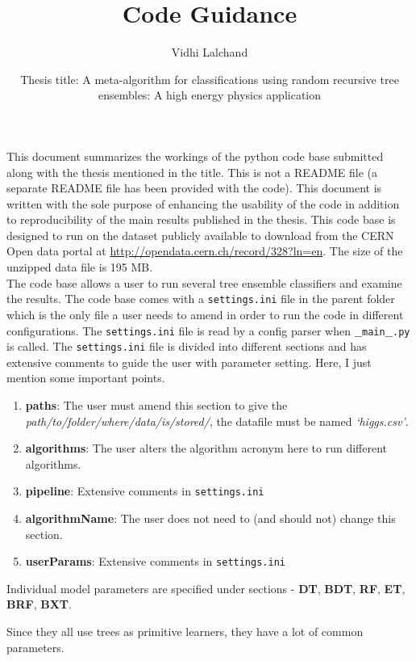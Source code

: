 \documentclass[a4paper,twoside]{article}
\title{Code Guidance}
\author{\small Vidhi Lalchand}
\date{\small Thesis title: A meta-algorithm for classifications using random recursive tree ensembles: A high energy physics application}
\begin{document}
\maketitle
This document summarizes the workings of the python code base submitted along with the thesis mentioned in the title.
This is not a README file (a separate README file has been provided with the code). This document is written with the sole purpose of enhancing the usability of the code in addition to reproducibility of the main results published in the thesis. This code base is designed to run on the dataset publicly available to download from the CERN Open data portal at \url{http://opendata.cern.ch/record/328?ln=en}. The size of the unzipped data file is 195 MB.\\
The code base allows a user to run several tree ensemble classifiers and examine the results. The code base comes with a \texttt{settings.ini} file in the parent folder which is the only file a user needs to amend in order to run the code in different configurations.  The \texttt{settings.ini} file is read by a config parser when \texttt{$\_\_$main$\_\_$.py}
is called. The \texttt{settings.ini} file is divided into different sections and has extensive comments to guide the user with parameter setting. Here, I just mention some important points. 

\begin{enumerate}
\item \textbf{paths}: The user must amend this section to give the \textit{path/to/folder/where/data/is/stored/}, the datafile must be named \textit{`higgs.csv'}. 
\item \textbf{algorithms}: The user alters the algorithm acronym here to run different algorithms.
\item \textbf{pipeline}: Extensive comments in \texttt{settings.ini}
\item \textbf{algorithmName}: The user does not need to (and should not) change this section.  
\item \textbf{userParams}: Extensive comments in \texttt{settings.ini}
\end{enumerate}

Individual model parameters are specified under sections - \textbf{DT}, \textbf{BDT}, \textbf{RF}, \textbf{ET}, \textbf{BRF}, \textbf{BXT}. 

Since they all use trees as primitive learners, they have a lot of common parameters.
\end{document}
